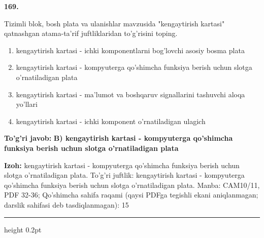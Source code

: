 \documentclass[10pt,a4paper]{article}
\begin{document}
{\bfseries\sffamily\color{ink} 169.}
\par
Tizimli blok, bosh plata va ulanishlar mavzusida "kengaytirish kartasi" qatnashgan atama-ta'rif juftliklaridan to'g'risini toping.
\begin{enumerate}[label=\Alph*),leftmargin=9mm]
\item kengaytirish kartasi - ichki komponentlarni bog'lovchi asosiy bosma plata
\item kengaytirish kartasi - kompyuterga qo'shimcha funksiya berish uchun slotga o'rnatiladigan plata
\item kengaytirish kartasi - ma'lumot va boshqaruv signallarini tashuvchi aloqa yo'llari
\item kengaytirish kartasi - ichki komponent o'rnatiladigan ulagich
\end{enumerate}
\begin{tcolorbox}[enhanced,breakable,colback=teal!4,colframe=teal!60!black,boxrule=0.45pt,arc=1.2mm,left=2.7mm,right=2.7mm,top=1.8mm,bottom=1.8mm,before skip=2mm,after skip=2mm]
{\bfseries\sffamily\color{teal}To'g'ri javob:} \textbf{B) kengaytirish kartasi - kompyuterga qo'shimcha funksiya berish uchun slotga o'rnatiladigan plata}
\par\smallskip
{\bfseries Izoh:} kengaytirish kartasi - kompyuterga qo'shimcha funksiya berish uchun slotga o'rnatiladigan plata. To'g'ri juftlik: kengaytirish kartasi - kompyuterga qo'shimcha funksiya berish uchun slotga o'rnatiladigan plata. Manba: CAM10/11, PDF 32-36; Qo'shimcha sahifa raqami (qaysi PDFga tegishli ekani aniqlanmagan; darslik sahifasi deb tasdiqlanmagan): 15
\end{tcolorbox}
\vspace{2mm}\hrule height 0.2pt\vspace{3mm}
\end{document}
